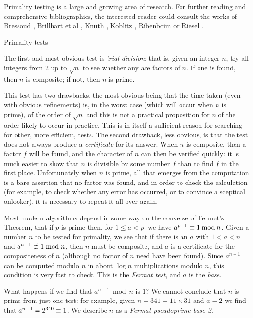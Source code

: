 Primality testing is a large and growing area of research.  For further reading
and comprehensive bibliographies, the interested reader could consult the works
of Bressoud \cite{11}, Brillhart et al \cite{12}, Knuth \cite{26}, Koblitz \cite{27},
Ribenboim \cite{40,41} or Riesel \cite{42}.

\subhead Primality tests \endsubhead

The first and most obvious test is {\it trial division}: that is,
given an integer $n$, try all integers from 2 up to $\sqrt{n}$
to see whether any are factors of $n$.  If one is found, then $n$
is composite; if not, then $n$ is prime.

This test has two drawbacks,
the most obvious being that the time taken (even with obvious refinements)
is, in the worst case (which will occur when $n$ is prime), of the order of $\sqrt n$
and this is not a practical proposition for $n$ of the order likely to
occur in practice.
This is in itself a sufficient reason for searching for other, more efficient,
tests.
The second drawback, less obvious, is that the test does not
always produce a {\it certificate} for its answer.
When $n$ is composite, then a factor $f$
will be found, and the character of $n$ can then be verified quickly: it is
much easier to show that $n$ is divisible by some number $f$ than to find $f$
in the first place.  Unfortunately when $n$ is prime, all that emerges from
the computation is a
bare assertion that no factor was found, and in order to check the
calculation (for example, to check whether any error has occurred, or to convince
a sceptical onlooker), it is necessary to repeat it all over again.

Most modern algorithms depend in some way on the converse of Fermat's
Theorem, that if $p$ is prime then, for $1 \le a < p$, we
have $a^{p-1} \equiv 1 \bmod n$.  Given a number $n$ to be tested
for primality, we see that if there is an $a$ with $1 < a < n$
and $a^{n-1} \not\equiv 1 \bmod n$, then $n$ must be composite, and
$a$ is a certificate for the compositeness of $n$ (although no factor
of $n$ need have been found).
Since $a^{n-1}$ can be computed modulo $n$ in about $\log n$ multiplications
modulo $n$, this condition is very fast to check.  This is the {\it Fermat
test}, and $a$ is the {\it base}.

What happens if we find that $a^{n-1} \bmod n$ is 1?  We cannot conclude
that $n$ is prime from just one test: for example,
given $n = 341 = 11 \times 31$ and $a = 2$ we find
that $a^{n-1} = 2^{340} \equiv 1$.  We describe $n$ as a {\it Fermat
pseudoprime base 2}.


